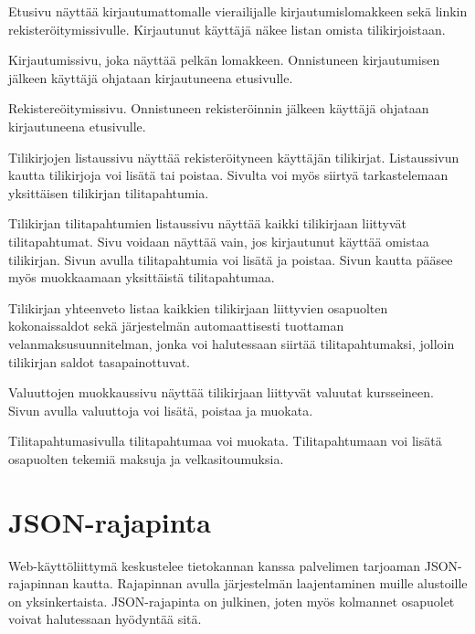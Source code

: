 \documentclass[a4paper]{scrartcl}
\begin{document}
\begin{description}[style=nextline]
  \item[/]{
      Etusivu näyttää kirjautumattomalle vierailijalle kirjautumislomakkeen sekä
      linkin rekisteröitymissivulle. Kirjautunut käyttäjä näkee listan omista
      tilikirjoistaan.
    }
  \item[/login]{
      Kirjautumissivu, joka näyttää pelkän lomakkeen. Onnistuneen kirjautumisen
      jälkeen käyttäjä ohjataan kirjautuneena etusivulle.
    }
  \item[/signup]{
      Rekistereöitymissivu. Onnistuneen rekisteröinnin jälkeen käyttäjä ohjataan
      kirjautuneena etusivulle.
    }
  \item[/ledgers]{
      Tilikirjojen listaussivu näyttää rekisteröityneen käyttäjän tilikirjat.
      Listaussivun kautta tilikirjoja voi lisätä tai poistaa. Sivulta voi myös
      siirtyä tarkastelemaan yksittäisen tilikirjan tilitapahtumia.
    }
  \item[/ledgers/:ledgerId]{
      Tilikirjan tilitapahtumien listaussivu näyttää kaikki tilikirjaan
      liittyvät tilitapahtumat. Sivu voidaan näyttää vain, jos kirjautunut
      käyttää omistaa tilikirjan. Sivun avulla tilitapahtumia voi lisätä ja
      poistaa. Sivun kautta pääsee myös muokkaamaan yksittäistä tilitapahtumaa.
    }
  \item[/ledgers/:ledgerId/summary]{
      Tilikirjan yhteenveto listaa kaikkien tilikirjaan liittyvien osapuolten
      kokonaissaldot sekä järjestelmän automaattisesti tuottaman
      velanmaksusuunnitelman, jonka voi halutessaan siirtää tilitapahtumaksi,
      jolloin tilikirjan saldot tasapainottuvat.
    }
  \item[/ledgers/:ledgerId/currencies]{
      Valuuttojen muokkaussivu näyttää tilikirjaan liittyvät valuutat
      kursseineen.  Sivun avulla valuuttoja voi lisätä, poistaa ja muokata.
    }
  \item[/ledgers/:ledgersId/:transactionId]{
      Tilitapahtumasivulla tilitapahtumaa voi muokata. Tilitapahtumaan voi
      lisätä osapuolten tekemiä maksuja ja velkasitoumuksia.
    }
\end{description}

\section{JSON-rajapinta}

Web-käyttöliittymä keskustelee tietokannan kanssa palvelimen tarjoaman
JSON-rajapinnan kautta. Rajapinnan avulla järjestelmän laajentaminen muille
alustoille on yksinkertaista. JSON-rajapinta on julkinen, joten myös kolmannet
osapuolet voivat halutessaan hyödyntää sitä.
\end{document}
